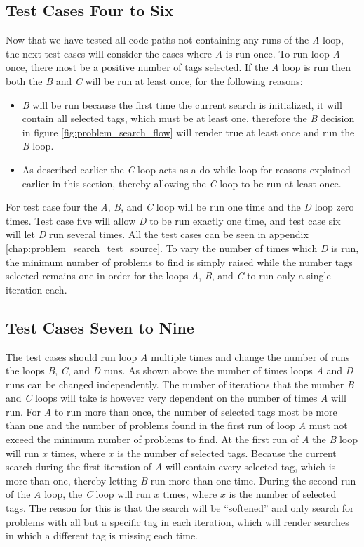 \subsection{Test Cases Four to Six}
Now that we have tested all code paths not containing any runs of the \textit{A} loop, the next test cases will consider the cases where \textit{A} is run once.
To run loop \textit{A} once, there most be a positive number of tags selected.
If the \textit{A} loop is run then both the \textit{B} and \textit{C} will be run at least once, for the following reasons:
\begin{itemize}
	\item \textit{B} will be run because the first time the current search is initialized, it will contain all selected tags, which must be at least one, therefore the \textit{B} decision in figure \ref{fig:problem_search_flow} will render true at least once and run the \textit{B} loop.
	\item As described earlier the \textit{C} loop acts as a do-while loop for reasons explained earlier in this section, thereby allowing the \textit{C} loop to be run at least once.
\end{itemize}

For test case four the \textit{A}, \textit{B}, and \textit{C} loop will be run one time and the \textit{D} loop zero times.
Test case five will allow \textit{D} to be run exactly one time, and test case six will let \textit{D} run several times.
All the test cases can be seen in appendix \ref{chap:problem_search_test_source}.
To vary the number of times which \textit{D} is run, the minimum number of problems to find is simply raised while the number tags selected remains one in order for the loops \textit{A}, \textit{B}, and \textit{C} to run only a single iteration each.

\subsection{Test Cases Seven to Nine}
The test cases should run loop \textit{A} multiple times and change the number of runs the loops \textit{B}, \textit{C}, and \textit{D} runs.
As shown above the  number of times loops \textit{A} and \textit{D} runs can be changed independently.
The number of iterations that the number \textit{B} and \textit{C} loops will take is however very dependent on the number of times \textit{A} will run.
For \textit{A} to run more than once, the number of selected tags most be more than one and the number of problems found in the first run of loop \textit{A} must not exceed the minimum number of problems to find.
At the first run of \textit{A} the \textit{B} loop will run $x$ times, where $x$ is the number of selected tags.
Because the current search during the first iteration of \textit{A} will contain every selected tag, which is more than one, thereby letting \textit{B} run more than one time.
During the second run of the \textit{A} loop, the \textit{C} loop will run $x$ times, where $x$ is the number of selected tags.
The reason for this is that the search will be ``softened'' and only search for problems with all but a specific tag in each iteration, which will render searches in which a different tag is missing each time. 

